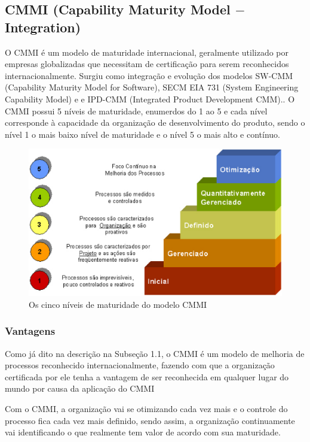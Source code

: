 \subsection{CMMI (Capability Maturity Model $-$ Integration)}

  O CMMI é um modelo de maturidade internacional, geralmente utilizado por empresas
  globalizadas que necessitam de certificação para serem reconhecidos internacionalmente.
  Surgiu como integração e evolução dos modelos SW-CMM (Capability Maturity Model for Software),
  SECM EIA 731 (System Engineering Capability Model) e  e IPD-CMM
  (Integrated Product Development CMM).\cite{mct2006}.
  O CMMI possui 5 níveis de maturidade, enumerdos do 1 ao 5 e cada nível corresponde
  à capacidade da organização de desenvolvimento do produto, sendo o nível 1 o mais
  baixo nível de maturidade e o nível 5 o mais alto e contínuo.

  \begin{figure}[!ht]
    \centering
    \includegraphics[width=15cm, keepaspectratio=true]{figuras/maturidade/niveis-cmmi.eps}
    \caption{Os cinco níveis de maturidade do modelo CMMI}
  \end{figure}

\subsubsection{Vantagens}

  Como já dito na descrição na Subseção 1.1, o CMMI é um modelo de melhoria
  de processos reconhecido internacionalmente, fazendo com que a organização
  certificada por ele tenha a vantagem de ser reconhecida em qualquer lugar
  do mundo por causa da aplicação do CMMI

  Com o CMMI, a organização vai se otimizando cada vez mais e o controle do
  processo fica cada vez mais definido, sendo assim, a organização continuamente
  vai identificando o que realmente tem valor de acordo com sua maturidade.


